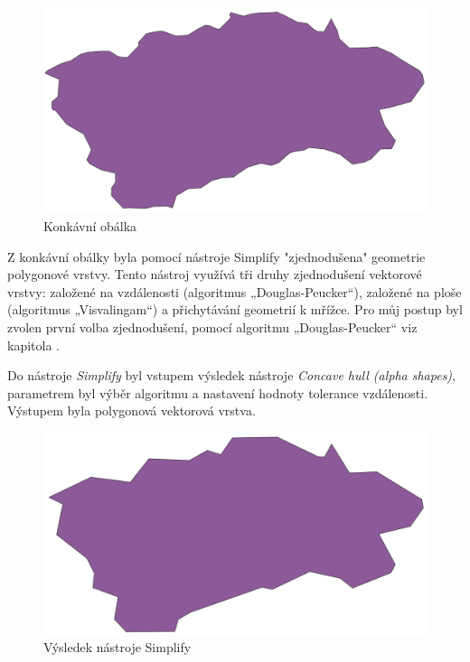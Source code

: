 \begin{figure}[H] \centering
    \includegraphics[width=400pt]{./pictures/concaveHull-P0B.png}
    \caption[Konkávní obálka]{Konkávní obálka}
	\label{fig:concaveHull-P0B}              
\end{figure} 

Z konkávní obálky byla pomocí nástroje Simplify "zjednodušena" geometrie polygonové vrstvy. Tento nástroj
využívá tři druhy zjednodušení vektorové vrstvy: založené na vzdálenosti (algoritmus „Douglas-Peucker“),
založené na ploše (algoritmus „Visvalingam“) a přichytávání geometrií k mřížce.
Pro můj postup byl zvolen první volba zjednodušení, pomocí algoritmu „Douglas-Peucker“ viz kapitola \label{generalizace_zjemneni}.


Do nástroje \textit{Simplify} byl vstupem výsledek nástroje \textit{Concave hull (alpha shapes)}, parametrem byl výběr algoritmu 
a nastavení hodnoty tolerance vzdálenosti. Výstupem byla polygonová vektorová vrstva.

\begin{figure}[H] \centering
    \includegraphics[width=400pt]{./pictures/simplify-P0B.png}
    \caption[Výsledek nástroje Simplify]{Výsledek nástroje Simplify}
	\label{fig:simplify-P0B}                                
\end{figure}

